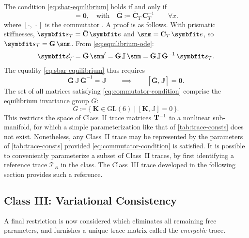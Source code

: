 The condition 
\eqref{eq:sbar-equilibrium} holds if and only if
\begin{equation}
[\bar{\mathbf{G}}, \mathbb{J}] = \mathbf{0}, 
\quad \text{with}\quad
\bar{\mathbf{G}} \coloneq \bar{\mathbf{C}}_T\,\mathbf{C}_T^{-1}
\qquad\forall x.
\label{eq:commutator-condition}
\end{equation}
where \([\cdot,\,\cdot]\) is the commutator \citep{abraham1988manifolds}. 
A proof is as follows. 
With prismatic stiffnesses, $\TraceStress = \bar{\mathbf{C}}\,\bm{e}$ and 
$\snm = \mathbf{C}_T\,\bm{e}$, so $\TraceStress = \bar{\mathbf{G}}\,\snm$. 
From \eqref{eq:equilibrium-ode}:
\begin{equation*}
\TraceStress' = \bar{\mathbf{G}}\,\snm' = \bar{\mathbf{G}}\,\mathbb{J}\,\snm 
= \bar{\mathbf{G}}\,\mathbb{J}\,\bar{\mathbf{G}}^{-1}\,\TraceStress.
\end{equation*}
The equality \eqref{eq:sbar-equilibrium} thus requires 
\[
\bar{\mathbf{G}}\,\mathbb{J}\,\bar{\mathbf{G}}^{-1} = \mathbb{J}
\qquad\implies\qquad
[\bar{\mathbf{G}}, \mathbb{J}] = \mathbf{0}.
\]
%
The set of all matrices satisfying \eqref{eq:commutator-condition} comprise the equilibrium invariance group $G$:
\[
G \coloneq \bigl\{\,\mathbf{K} \in \mathrm{GL}(6) \;\big|\; [\mathbf{K},\mathbb{J}] = 0\,\bigr\}.
\]
This restricts the space of Class~II trace matrices \({\mathbf{T}^{-1}}\) to a nonlinear sub-manifold, for which a simple parameterization like that of \cref{tab:trace-consts} does not exist. 
Nonetheless, any Class~II trace may be represented by the parameters of \cref{tab:trace-consts} provided \eqref{eq:commutator-condition} is satisfied. 
It is possible to conveniently parameterize a subset of Class~II traces, by first identifying a reference trace \(\mathcal{T}_R\) in the class. 
The Class~III trace developed in the following section provides such a reference. 


\subsection{Class III: Variational Consistency}\label{sec:class-iii}
A final restriction is now considered which eliminates all remaining free parameters, and furnishes a unique trace matrix called the \emph{energetic} trace. 

